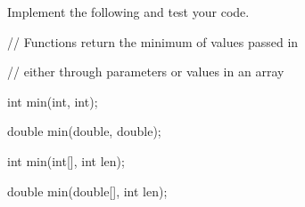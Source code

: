 Implement the following and test your code.



\begin{consolethree}[escapeinside=||]

// Functions return the minimum of values passed in

// either through parameters or values in an array

int min(int, int);

double min(double, double);

int min(int[], int len);

double min(double[], int len);

\end{consolethree}

